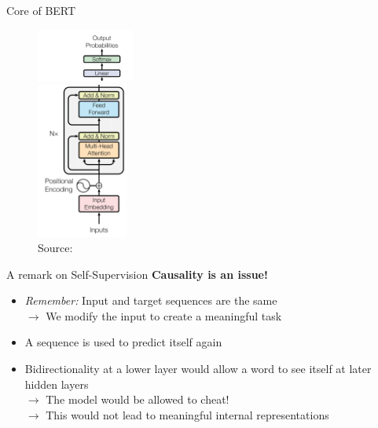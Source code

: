 \documentclass[]{beamer}
\begin{document}
\begin{frame}{Core of BERT \href{https://arxiv.org/pdf/1810.04805.pdf}{}}
\begin{figure}
\centering
\includegraphics[width = 3.2cm]{figure/bert-top.png}\\ 
\includegraphics[width = 3cm]{figure/bert-bottom.png}\\ 
\footnotesize{Source:} \href{https://arxiv.org/pdf/1706.03762.pdf}{}
\end{figure}
\end{frame}



\begin{frame}{A remark on Self-Supervision}
	\textbf{Causality is an issue!}
	
	\begin{itemize}
		\item \textit{Remember:} Input and target sequences are the same\\
					$\rightarrow$ We modify the input to create a meaningful task 
		\item A sequence is used to predict itself again
		\item Bidirectionality at a lower layer would allow a word to see itself at later hidden layers\\
					$\rightarrow$ The model would be allowed to cheat!\\
					$\rightarrow$ This would not lead to meaningful internal representations
	\end{itemize}
\end{frame}
\end{document}
